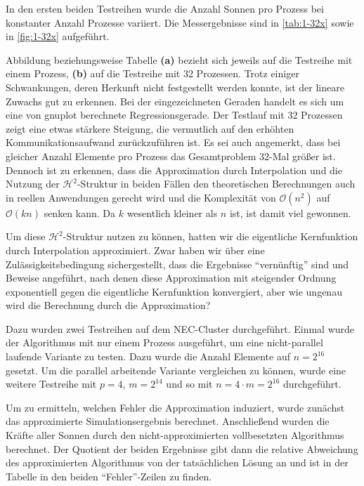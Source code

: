   In den ersten beiden Testreihen wurde die Anzahl Sonnen pro Prozess bei konstanter Anzahl Prozesse variiert. Die Messergebnisse sind in \autoref{tab:1-32x} sowie in \autoref{fig:1-32x} 
  aufgeführt.
  
  Abbildung beziehungsweise Tabelle \textbf{(a)} bezieht sich jeweils auf die Testreihe mit einem Prozess, \textbf{(b)} auf die Testreihe mit 32 Prozessen. Trotz einiger Schwankungen, deren Herkunft
  nicht festgestellt werden konnte, ist der lineare Zuwachs gut zu erkennen. Bei der eingezeichneten Geraden handelt es sich um eine von gnuplot berechnete Regressionsgerade. Der Testlauf mit $32$ 
  Prozessen zeigt eine etwas stärkere Steigung, die vermutlich auf den erhöhten Kommunikationsaufwand zurückzuführen ist. Es sei auch angemerkt, dass bei gleicher Anzahl Elemente pro Prozess das
  Gesamtproblem $32$-Mal größer ist. Dennoch ist zu erkennen, dass die Approximation durch Interpolation und die Nutzung der $\mathcal{H}^2$-Struktur in beiden Fällen den theoretischen Berechnungen 
  auch in reellen Anwendungen gerecht wird und die Komplexität von $\mathcal{O}(n^2)$ auf $\mathcal{O}(k n)$ senken kann. Da $k$ wesentlich kleiner als $n$ ist, ist damit viel gewonnen.
  
  Um diese $\mathcal{H}^2$-Struktur nutzen zu können, hatten wir die eigentliche Kernfunktion durch Interpolation approximiert. Zwar haben wir über eine Zulässigkeitsbedingung sichergestellt, dass die 
  Ergebnisse ``vernünftig'' sind und Beweise angeführt, nach denen diese Approximation mit steigender Ordnung exponentiell gegen die eigentliche Kernfunktion konvergiert, aber wie ungenau wird die
  Berechnung durch die Approximation? 
  
  Dazu wurden zwei Testreihen auf dem NEC-Cluster durchgeführt. Einmal wurde der Algorithmus mit nur einem Prozess ausgeführt, um eine nicht-parallel laufende Variante zu testen. Dazu wurde
  die Anzahl Elemente auf $n = 2^{16}$ gesetzt. Um die parallel arbeitende Variante vergleichen zu können, wurde eine weitere Testreihe mit $p = 4$, $m = 2^{14}$ und so mit $n = 4 \cdot m = 2^{16}$
  durchgeführt.
  
  Um zu ermitteln, welchen Fehler die Approximation induziert, wurde zunächst das approximierte Simulationsergebnis berechnet. Anschließend wurden die Kräfte aller Sonnen durch den 
  nicht-approximierten vollbesetzten Algorithmus berechnet. Der Quotient der beiden Ergebnisse gibt dann die relative Abweichung des approximierten Algorithmus von der tatsächlichen Lösung an und ist
  in der Tabelle in den beiden ``Fehler''-Zeilen zu finden.
  
